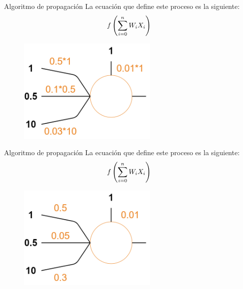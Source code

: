 \begin{frame}{Algoritmo de propagación}
La ecuación que define este \alert{proceso} es la siguiente:
\setcounter{equation}{0}
\begin{equation}
    \Large f\left(\sum_{i=0}^{n} W_{i} X_{i}\right)
\end{equation}

\begin{figure}
\centering
    \includegraphics[width=0.6\textwidth]{figures/Tema 3/PropagationExample_2.png}
\end{figure}
\end{frame}

\begin{frame}{Algoritmo de propagación}
La ecuación que define este \alert{proceso} es la siguiente:
\setcounter{equation}{0}
\begin{equation}
    \Large f\left(\sum_{i=0}^{n} W_{i} X_{i}\right)
\end{equation}

\begin{figure}
\centering
    \includegraphics[width=0.6\textwidth]{figures/Tema 3/PropagationExample_3.png}
\end{figure}
\end{frame}

